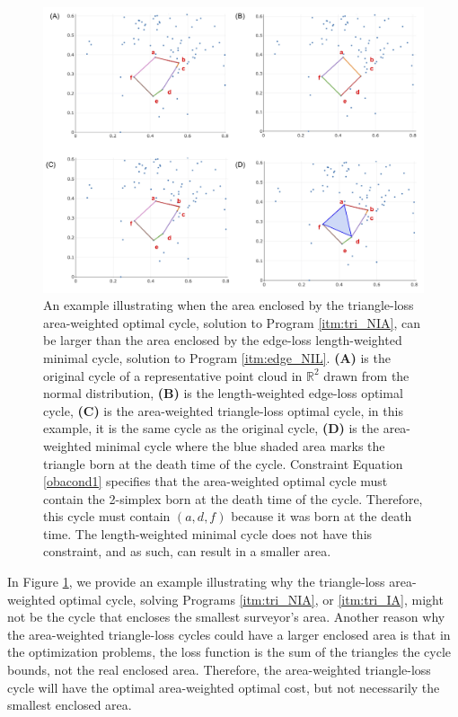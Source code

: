 \documentclass[11pt,onecolumn]{article}
\newcommand{\pr}{Program }
\theoremstyle{plain}
\theoremstyle{definition}
\begin{document}
\begin{figure}[h!]
\begin{center}
\includegraphics[width=\textwidth]{figures/areaexample.jpg}
\end{center}
\caption{An example illustrating when the area enclosed by the triangle-loss area-weighted optimal cycle, solution to \pr \ref{itm:tri_NIA}, can be larger than the area enclosed by the edge-loss length-weighted minimal cycle, solution to \pr \ref{itm:edge_NIL}. \textbf{(A)} is the original cycle of a representative point cloud in $\mathbb{R}^2$ drawn from the normal distribution, \textbf{(B)} is the length-weighted edge-loss optimal cycle, \textbf{(C)} is the area-weighted triangle-loss optimal cycle, in this example, it is the same cycle as the original cycle, \textbf{(D)} is the area-weighted minimal cycle where the blue shaded area marks the triangle born at the death time of the cycle.  
Constraint Equation \eqref{obacond1} specifies that the area-weighted optimal cycle must contain the 2-simplex born at the death time of the cycle. Therefore, this cycle must contain $(a,d,f)$ because it was born at the death time. The length-weighted minimal cycle does not have this constraint, and as such, can result in a smaller area. 
}\label{fig:areaExample}
\end{figure}


In Figure \ref{fig:areaExample}, we provide an example illustrating why the triangle-loss area-weighted optimal cycle, solving Programs \ref{itm:tri_NIA}, or
\ref{itm:tri_IA}, might not be the cycle that encloses the smallest surveyor's area. Another reason why the area-weighted triangle-loss cycles could have a larger enclosed area is that in the optimization problems, the loss function is the sum of the triangles the cycle bounds, not the real enclosed area. Therefore, the area-weighted triangle-loss cycle will have the optimal area-weighted optimal cost, but not necessarily the smallest enclosed area. 
\end{document}
